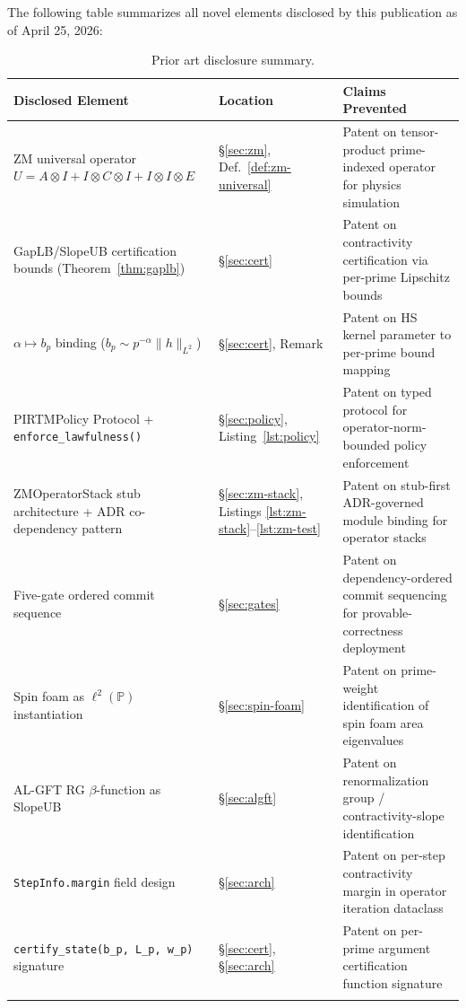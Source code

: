 \documentclass[12pt,letterpaper]{article}
\theoremstyle{definition}
\theoremstyle{remark}
\begin{document}
The following table summarizes all novel elements disclosed by this publication
as of April 25, 2026:

\begin{longtable}{p{4.2cm}p{3.5cm}p{5.5cm}}
\toprule
\textbf{Disclosed Element} & \textbf{Location} & \textbf{Claims Prevented} \\
\midrule
ZM universal operator $U = A \otimes I + I \otimes C \otimes I + I \otimes I \otimes E$
& \S\ref{sec:zm}, Def.~\ref{def:zm-universal}
& Patent on tensor-product prime-indexed operator for physics simulation \\[4pt]

GapLB/SlopeUB certification bounds (Theorem~\ref{thm:gaplb})
& \S\ref{sec:cert}
& Patent on contractivity certification via per-prime Lipschitz bounds \\[4pt]

$\alpha \mapsto b_p$ binding ($b_p \sim p^{-\alpha}\|h\|_{L^2}$)
& \S\ref{sec:cert}, Remark
& Patent on HS kernel parameter to per-prime bound mapping \\[4pt]

PIRTMPolicy Protocol + \texttt{enforce\_lawfulness()}
& \S\ref{sec:policy}, Listing~\ref{lst:policy}
& Patent on typed protocol for operator-norm-bounded policy enforcement \\[4pt]

ZMOperatorStack stub architecture + ADR co-dependency pattern
& \S\ref{sec:zm-stack}, Listings \ref{lst:zm-stack}--\ref{lst:zm-test}
& Patent on stub-first ADR-governed module binding for operator stacks \\[4pt]

Five-gate ordered commit sequence
& \S\ref{sec:gates}
& Patent on dependency-ordered commit sequencing for provable-correctness deployment \\[4pt]

Spin foam as $\ell^2(\mathbb{P})$ instantiation
& \S\ref{sec:spin-foam}
& Patent on prime-weight identification of spin foam area eigenvalues \\[4pt]

AL-GFT RG $\beta$-function as SlopeUB
& \S\ref{sec:algft}
& Patent on renormalization group / contractivity-slope identification \\[4pt]

\texttt{StepInfo.margin} field design
& \S\ref{sec:arch}
& Patent on per-step contractivity margin in operator iteration dataclass \\[4pt]

\texttt{certify\_state(b\_p, L\_p, w\_p)} signature
& \S\ref{sec:cert}, \S\ref{sec:arch}
& Patent on per-prime argument certification function signature \\
\bottomrule
\caption{Prior art disclosure summary.}
\end{longtable}
\end{document}

